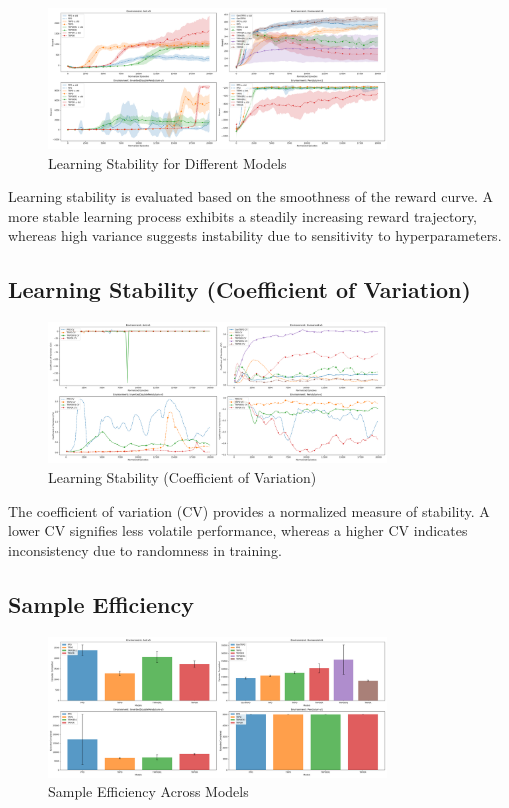 \documentclass{svproc}
\begin{document}
\begin{figure}[H]
    \centering
    \includegraphics[width=0.8\textwidth]{.assets/learning_stability.png}
    \caption{Learning Stability for Different Models}
\end{figure}

Learning stability is evaluated based on the smoothness of the reward curve. A more stable learning process exhibits a steadily increasing reward trajectory, whereas high variance suggests instability due to sensitivity to hyperparameters.

\subsection{Learning Stability (Coefficient of Variation)}

\begin{figure}[H]
    \centering
    \includegraphics[width=0.8\textwidth]{.assets/learning_stability_cv.png}
    \caption{Learning Stability (Coefficient of Variation)}
\end{figure}

The coefficient of variation (CV) provides a normalized measure of stability. A lower CV signifies less volatile performance, whereas a higher CV indicates inconsistency due to randomness in training.

\subsection{Sample Efficiency}

\begin{figure}[H]
    \centering
    \includegraphics[width=0.8\textwidth]{.assets/sample_efficiency.png}
    \caption{Sample Efficiency Across Models}
\end{figure}
\end{document}
